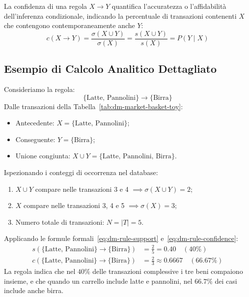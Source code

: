 \begin{definition}
La confidenza di una regola $X \rightarrow Y$ quantifica l'accuratezza o l'affidabilità dell'inferenza condizionale, indicando la percentuale di transazioni contenenti $X$ che contengono contemporaneamente anche $Y$:
\begin{equation}
\label{eq:dm-rule-confidence}
c(X \longrightarrow Y) = \frac{\sigma(X \cup Y)}{\sigma(X)} = \frac{s(X \cup Y)}{s(X)} = P(Y \mid X)
\end{equation}
\end{definition}

\FloatBarrier
\subsection{Esempio di Calcolo Analitico Dettagliato}
Consideriamo la regola:
\begin{equation}
\{\text{Latte, Pannolini}\} \longrightarrow \{\text{Birra}\}
\end{equation}
Dalle transazioni della Tabella~\ref{tab:dm-market-basket-toy}:
\begin{itemize}[noitemsep]
    \item Antecedente: $X = \{\text{Latte, Pannolini}\}$;
    \item Conseguente: $Y = \{\text{Birra}\}$;
    \item Unione congiunta: $X \cup Y = \{\text{Latte, Pannolini, Birra}\}$.
\end{itemize}

Ispezionando i conteggi di occorrenza nel database:
\begin{enumerate}[noitemsep]
    \item $X \cup Y$ compare nelle transazioni 3 e 4 $\implies \sigma(X \cup Y) = 2$;
    \item $X$ compare nelle transazioni 3, 4 e 5 $\implies \sigma(X) = 3$;
    \item Numero totale di transazioni: $N = |T| = 5$.
\end{enumerate}

Applicando le formule formali~\eqref{eq:dm-rule-support} e~\eqref{eq:dm-rule-confidence}:
\begin{align}
s(\{\text{Latte, Pannolini}\} \rightarrow \{\text{Birra}\}) &= \frac{2}{5} = 0.40 \quad (40\%) \\
c(\{\text{Latte, Pannolini}\} \rightarrow \{\text{Birra}\}) &= \frac{2}{3} \approx 0.6667 \quad (66.67\%)
\end{align}
La regola indica che nel $40\%$ delle transazioni complessive i tre beni compaiono insieme, e che quando un carrello include latte e pannolini, nel $66.7\%$ dei casi include anche birra.

